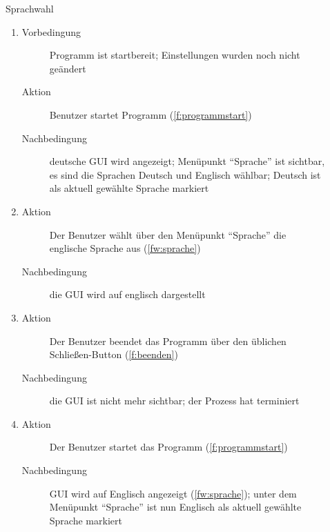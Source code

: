 \begin{description}
	\item[] Sprachwahl
	\begin{enumerate}
		\item
		\begin{description}
			\item[Vorbedingung] Programm ist startbereit; Einstellungen wurden noch nicht geändert
			\item[Aktion] Benutzer startet Programm (\ref{f:programmstart})
			\item[Nachbedingung] deutsche GUI wird angezeigt; Menüpunkt \enquote{Sprache} ist sichtbar, es sind die Sprachen Deutsch und Englisch wählbar; Deutsch ist als aktuell gewählte Sprache markiert
		\end{description}
		\item
		\begin{description}
			\item[Aktion] Der Benutzer wählt über den Menüpunkt \enquote{Sprache} die englische Sprache aus (\ref{fw:sprache})
			\item[Nachbedingung] die GUI wird auf englisch dargestellt
		\end{description}
		\item
		\begin{description}
			\item[Aktion] Der Benutzer beendet das Programm über den üblichen Schließen-Button (\ref{f:beenden})
			\item[Nachbedingung] die GUI ist nicht mehr sichtbar; der Prozess hat terminiert
		\end{description}
		\item
		\begin{description}
			\item[Aktion] Der Benutzer startet das Programm (\ref{f:programmstart})
			\item[Nachbedingung] GUI wird auf Englisch angezeigt (\ref{fw:sprache}); unter dem Menüpunkt \enquote{Sprache} ist nun Englisch als aktuell gewählte Sprache markiert
		\end{description}
	\end{enumerate}


\end{description}
